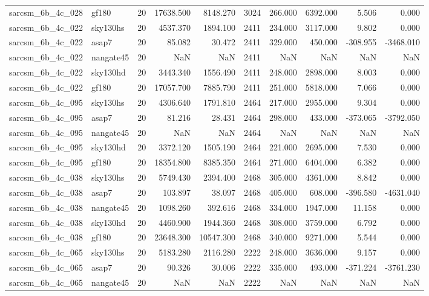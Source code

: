 \documentclass{article}
\begin{document}
\begin{longtable}{llrrrrrrrr}
sarcsm\_6b\_4c\_028 & gf180 & 20 & 17638.500 & 8148.270 & 3024 & 266.000 & 6392.000 & 5.506 & 0.000 \\
sarcsm\_6b\_4c\_022 & sky130hs & 20 & 4537.370 & 1894.100 & 2411 & 234.000 & 3117.000 & 9.802 & 0.000 \\
sarcsm\_6b\_4c\_022 & asap7 & 20 & 85.082 & 30.472 & 2411 & 329.000 & 450.000 & -308.955 & -3468.010 \\
sarcsm\_6b\_4c\_022 & nangate45 & 20 & NaN & NaN & 2411 & NaN & NaN & NaN & NaN \\
sarcsm\_6b\_4c\_022 & sky130hd & 20 & 3443.340 & 1556.490 & 2411 & 248.000 & 2898.000 & 8.003 & 0.000 \\
sarcsm\_6b\_4c\_022 & gf180 & 20 & 17057.700 & 7885.790 & 2411 & 251.000 & 5818.000 & 7.066 & 0.000 \\
sarcsm\_6b\_4c\_095 & sky130hs & 20 & 4306.640 & 1791.810 & 2464 & 217.000 & 2955.000 & 9.304 & 0.000 \\
sarcsm\_6b\_4c\_095 & asap7 & 20 & 81.216 & 28.431 & 2464 & 298.000 & 433.000 & -373.065 & -3792.050 \\
sarcsm\_6b\_4c\_095 & nangate45 & 20 & NaN & NaN & 2464 & NaN & NaN & NaN & NaN \\
sarcsm\_6b\_4c\_095 & sky130hd & 20 & 3372.120 & 1505.190 & 2464 & 221.000 & 2695.000 & 7.530 & 0.000 \\
sarcsm\_6b\_4c\_095 & gf180 & 20 & 18354.800 & 8385.350 & 2464 & 271.000 & 6404.000 & 6.382 & 0.000 \\
sarcsm\_6b\_4c\_038 & sky130hs & 20 & 5749.430 & 2394.400 & 2468 & 305.000 & 4361.000 & 8.842 & 0.000 \\
sarcsm\_6b\_4c\_038 & asap7 & 20 & 103.897 & 38.097 & 2468 & 405.000 & 608.000 & -396.580 & -4631.040 \\
sarcsm\_6b\_4c\_038 & nangate45 & 20 & 1098.260 & 392.616 & 2468 & 334.000 & 1947.000 & 11.158 & 0.000 \\
sarcsm\_6b\_4c\_038 & sky130hd & 20 & 4460.900 & 1944.360 & 2468 & 308.000 & 3759.000 & 6.792 & 0.000 \\
sarcsm\_6b\_4c\_038 & gf180 & 20 & 23648.300 & 10547.300 & 2468 & 340.000 & 9271.000 & 5.544 & 0.000 \\
sarcsm\_6b\_4c\_065 & sky130hs & 20 & 5183.280 & 2116.280 & 2222 & 248.000 & 3636.000 & 9.157 & 0.000 \\
sarcsm\_6b\_4c\_065 & asap7 & 20 & 90.326 & 30.006 & 2222 & 335.000 & 493.000 & -371.224 & -3761.230 \\
sarcsm\_6b\_4c\_065 & nangate45 & 20 & NaN & NaN & 2222 & NaN & NaN & NaN & NaN \\

\end{longtable}
\end{document}
